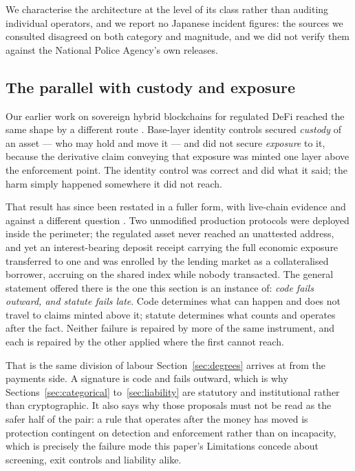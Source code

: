 \documentclass[10pt,a4paper,twocolumn]{article}
\begin{document}
We characterise the architecture at the level of its class rather than auditing
individual operators, and we report no Japanese incident figures: the sources we
consulted disagreed on both category and magnitude, and we did not verify them
against the National Police Agency's own releases.

\subsection{The parallel with custody and exposure}

Our earlier work on sovereign hybrid blockchains for regulated DeFi reached the
same shape by a different route \citep{sengtha2026csb}. Base-layer identity
controls secured \emph{custody} of an asset --- who may hold and move it --- and did
not secure \emph{exposure} to it, because the derivative claim conveying that
exposure was minted one layer above the enforcement point. The identity control
was correct and did what it said; the harm simply happened somewhere it did not
reach.

That result has since been restated in a fuller form, with live-chain evidence
and against a different question \citep{chay2026stages}. Two unmodified
production protocols were deployed inside the perimeter; the regulated asset
never reached an unattested address, and yet an interest-bearing deposit receipt
carrying the full economic exposure transferred to one and was enrolled by the
lending market as a collateralised borrower, accruing on the shared index while
nobody transacted. The general statement offered there is the one this section
is an instance of: \emph{code fails outward, and statute fails late}. Code
determines what can happen and does not travel to claims minted above it;
statute determines what counts and operates after the fact. Neither failure is
repaired by more of the same instrument, and each is repaired by the other
applied where the first cannot reach.

That is the same division of labour Section~\ref{sec:degrees} arrives at from
the payments side. A signature is code and fails outward, which is why
Sections~\ref{sec:categorical} to~\ref{sec:liability} are statutory and
institutional rather than cryptographic. It also says why those proposals must
not be read as the safer half of the pair: a rule that operates after the money
has moved is protection contingent on detection and enforcement rather than on
incapacity, which is precisely the failure mode this paper's Limitations
concede about screening, exit controls and liability alike.
\end{document}
